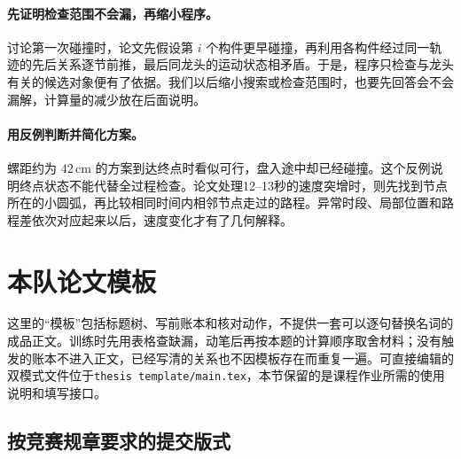 \documentclass[UTF8,zihao=-4]{ctexart}
\begin{document}
\paragraph{先证明检查范围不会漏，再缩小程序。}
讨论第一次碰撞时，论文先假设第 $i$ 个构件更早碰撞，再利用各构件经过同一轨迹的先后关系逐节前推，最后同龙头的运动状态相矛盾。于是，程序只检查与龙头有关的候选对象便有了依据。我们以后缩小搜索或检查范围时，也要先回答会不会漏解，计算量的减少放在后面说明。

\paragraph{用反例判断并简化方案。}
螺距约为 $42\,\mathrm{cm}$ 的方案到达终点时看似可行，盘入途中却已经碰撞。这个反例说明终点状态不能代替全过程检查。论文处理12--13秒的速度突增时，则先找到节点所在的小圆弧，再比较相同时间内相邻节点走过的路程。异常时段、局部位置和路程差依次对应起来以后，速度变化才有了几何解释。


\clearpage
\section{本队论文模板}

这里的“模板”包括标题树、写前账本和核对动作，不提供一套可以逐句替换名词的成品正文。训练时先用表格查缺漏，动笔后再按本题的计算顺序取舍材料；没有触发的账本不进入正文，已经写清的关系也不因模板存在而重复一遍。可直接编辑的双模式文件位于\texttt{thesis\ template/main.tex}，本节保留的是课程作业所需的使用说明和填写接口。

\subsection{按竞赛规章要求的提交版式}
\end{document}
